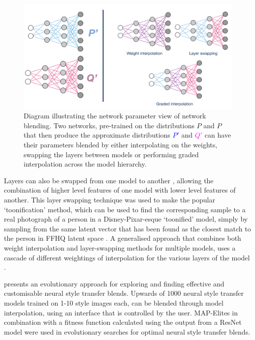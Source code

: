 \begin{figure}[!htbp]
    \centering
    \includegraphics[width=1\textwidth]{figures/c6_active_div/diagrams/network_blending.png}
    \caption[Diagram illustrating the network parameter view of network blending.]{Diagram illustrating the network parameter view of network blending. Two networks, pre-trained on the distributions $P$ and $P$ that then produce the approximate distributions \textcolor{blue}{$P'$} and \textcolor{magenta}{$Q'$} can have their parameters blended by either interpolating on the weights, swapping the layers between models or performing graded interpolation across the model hierarchy.}
  \label{fig:c6:network-blending}
  \end{figure}

Layers can also be swapped from one model to another \citep{pinkney2020interpolation}, allowing the combination of higher level features of one model with lower level features of another. 
This layer swapping technique was used to make the popular `toonification' method, which can be used to find the corresponding sample to a real photograph of a person in a Disney-Pixar-esque `toonified' model, simply by sampling from the same latent vector that has been found as the closest match to the person in FFHQ latent space \citep{abdal2019image2stylegan}. 
A generalised approach that combines both weight interpolation and layer-swapping methods for multiple models, uses a cascade of different weightings of interpolation for the various layers of the model \citep{arfafax2020barycentricnotebook}.

\citet{colton2021evolving} presents an evolutionary approach for exploring and finding effective and customisable neural style transfer blends. 
Upwards of 1000 neural style transfer models trained on 1-10 style images each, can be blended through model interpolation, using an interface that is controlled by the user. 
MAP-Elites \citep{mouret2015illuminating} in combination with a fitness function calculated using the output from a ResNet model \citep{he2016deep} were used in evolutionary searches for optimal neural style transfer blends. 

